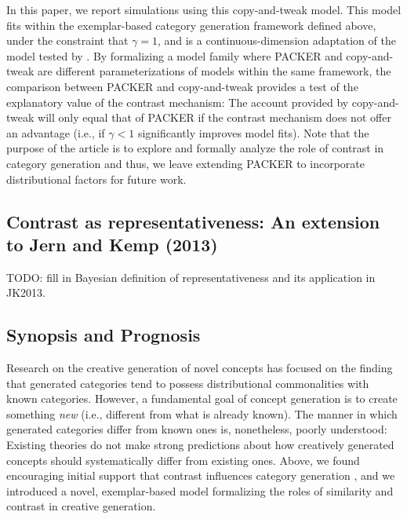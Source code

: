 \documentclass[12pt]{article}
\begin{document}
\begin{flushleft}
In this paper, we report simulations using this copy-and-tweak model. This model fits within the exemplar-based category generation framework defined above, under the constraint that $\gamma = 1$, and is a continuous-dimension adaptation of the model tested by \cite{jern2013probabilistic}. By formalizing a model family where PACKER and copy-and-tweak are different parameterizations of models within the same framework, the comparison between PACKER and copy-and-tweak provides a test of the explanatory value of the contrast mechanism: The account provided by copy-and-tweak will only equal that of PACKER if the contrast mechanism does not offer an advantage (i.e., if $\gamma < 1$ significantly improves model fits). Note that the purpose of the article is to explore and formally analyze the role of contrast in category generation and thus, we leave extending PACKER to incorporate distributional factors \citep[as explored by][]{jern2013probabilistic} for future work.

\subsection{Contrast as representativeness: An extension to Jern and Kemp (2013)}

TODO: fill in Bayesian definition of representativeness and its application in JK2013.

\subsection{Synopsis and Prognosis}

Research on the creative generation of novel concepts has focused on the finding that generated categories tend to possess distributional commonalities with known categories. However, a fundamental goal of concept generation is to create something {\em new} (i.e., different from what is already known). The manner in which generated categories differ from known ones is, nonetheless, poorly understood: Existing theories do not make strong predictions about how creatively generated concepts should systematically differ from existing ones. Above, we found encouraging initial support that contrast influences category generation \citep[][Experiment 3]{jern2013probabilistic}, and we introduced a novel, exemplar-based model formalizing the roles of similarity and contrast in creative generation.


\end{flushleft}
\end{document}
